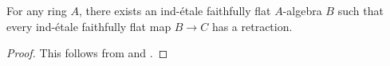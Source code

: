 \begin{corollary}
    For any ring $A$, there exists an ind-étale faithfully flat $A$-algebra $B$ such that
    every ind-étale faithfully flat map $B \to C$ has a retraction.
    \label{cor:ind-etale-retraction-cover-exists}
    \leanok
\end{corollary}

\begin{proof}
    \leanok
    This follows from  and .
\end{proof}
